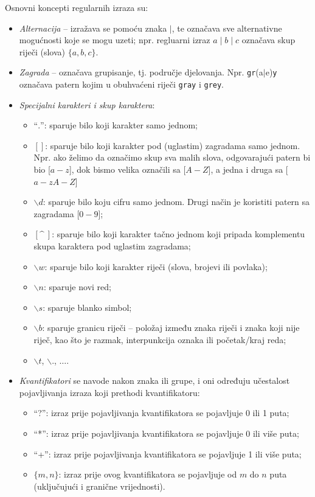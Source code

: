 Osnovni koncepti regularnih izraza su:
\begin{itemize}
	\item \textit{Alternacija} -- izražava se pomoću znaka $\mid$, te označava sve alterna\-tivne mogućnosti koje se mogu uzeti; npr. regluarni izraz $a\mid b\mid c$ označava skup riječi (slova) $\{a, b, c\}$.  
	\item \textit{Zagrada} -- označava grupisanje, tj. područje djelovanja. Npr. \texttt{gr}(a$\mid$e)\texttt{y} označava patern kojim u obuhvaćeni riječi \texttt{gray} i \texttt{grey}.
    \item \textit{Specijalni karakteri i skup karaktera}:
    \begin{itemize}
    	\item ``$.$'': sparuje bilo koji karakter samo jednom; 
    	\item $[]$: sparuje bilo koji karakter pod (uglastim) zagradama samo jednom. Npr. ako želimo da označimo skup sva malih slova, odgovarajući patern bi bio [$a-z$], dok bismo velika označili sa [$A-Z$], a jedna i druga sa [$a-zA-Z$]
    	\item $\backslash d$: sparuje bilo koju cifru samo jednom. Drugi način je koristiti patern sa zagradama [$0-9$];
    	\item $[\^ \   ]$: sparuje bilo koji karakter tačno jednom koji pripada komple\-mentu skupa karaktera pod
    	uglastim zagradama; 
    	\item $\backslash w$: sparuje bilo koji karakter riječi (slova, brojevi ili povlaka); 
    	\item $\backslash n$: sparuje novi red;
    	\item $\backslash s$: sparuje blanko simbol; 
    	\item $\backslash b$: sparuje granicu riječi -- položaj između znaka riječi i znaka koji nije riječ, kao što je razmak, interpunkcija oznaka ili početak/kraj reda;
    	\item $\backslash t$, $\backslash .$, $\ldots$.
    \end{itemize}
	\item  \textit{Kvantifikatori} se navode nakon znaka ili grupe, i oni određuju  učestalost
pojavljivanja izraza koji prethodi kvantifikatoru:
\begin{itemize}
	\item ``?'': izraz prije pojavljivanja kvantifikatora se pojavljuje 0 ili 1 puta; %
	\item ``*'': izraz prije pojavljivanja kvantifikatora se pojavljuje 0 ili više puta;
	\item  ``+'': izraz prije pojavljivanja kvantifikatora se pojavljuje  1 ili više puta;
	\item $\{m,n\}$: izraz prije ovog kvantifikatora se pojavljuje od $m$ do $n$ puta (uključujući i granične vrijednosti).
\end{itemize}
\end{itemize}

